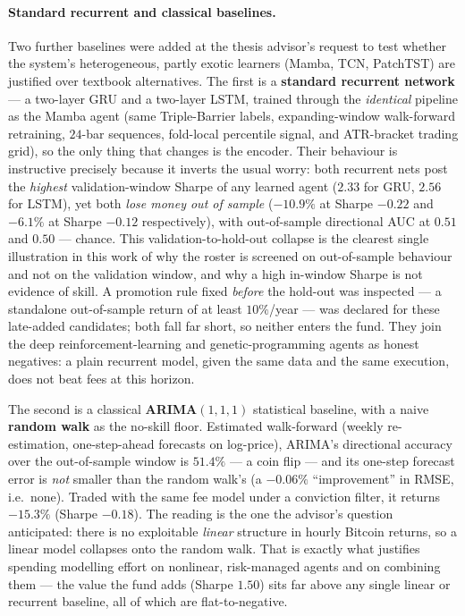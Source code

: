 \paragraph{Standard recurrent and classical baselines.} Two further baselines were added at the thesis advisor's request to test whether the system's heterogeneous, partly exotic learners (Mamba, TCN, PatchTST) are justified over textbook alternatives. The first is a \textbf{standard recurrent network} --- a two-layer GRU and a two-layer LSTM, trained through the \emph{identical} pipeline as the Mamba agent (same Triple-Barrier labels, expanding-window walk-forward retraining, $24$-bar sequences, fold-local percentile signal, and ATR-bracket trading grid), so the only thing that changes is the encoder. Their behaviour is instructive precisely because it inverts the usual worry: both recurrent nets post the \emph{highest} validation-window Sharpe of any learned agent ($2.33$ for GRU, $2.56$ for LSTM), yet both \emph{lose money out of sample} ($-10.9\%$ at Sharpe $-0.22$ and $-6.1\%$ at Sharpe $-0.12$ respectively), with out-of-sample directional AUC at $0.51$ and $0.50$ --- chance. This validation-to-hold-out collapse is the clearest single illustration in this work of why the roster is screened on out-of-sample behaviour and not on the validation window, and why a high in-window Sharpe is not evidence of skill. A promotion rule fixed \emph{before} the hold-out was inspected --- a standalone out-of-sample return of at least $10\%$/year --- was declared for these late-added candidates; both fall far short, so neither enters the fund. They join the deep reinforcement-learning and genetic-programming agents as honest negatives: a plain recurrent model, given the same data and the same execution, does not beat fees at this horizon.

The second is a classical \textbf{ARIMA$(1,1,1)$} statistical baseline, with a naive \textbf{random walk} as the no-skill floor. Estimated walk-forward (weekly re-estimation, one-step-ahead forecasts on log-price), ARIMA's directional accuracy over the out-of-sample window is $51.4\%$ --- a coin flip --- and its one-step forecast error is \emph{not} smaller than the random walk's (a $-0.06\%$ ``improvement'' in RMSE, i.e.\ none). Traded with the same fee model under a conviction filter, it returns $-15.3\%$ (Sharpe $-0.18$). The reading is the one the advisor's question anticipated: there is no exploitable \emph{linear} structure in hourly Bitcoin returns, so a linear model collapses onto the random walk. That is exactly what justifies spending modelling effort on nonlinear, risk-managed agents and on combining them --- the value the fund adds (Sharpe $1.50$) sits far above any single linear or recurrent baseline, all of which are flat-to-negative.

